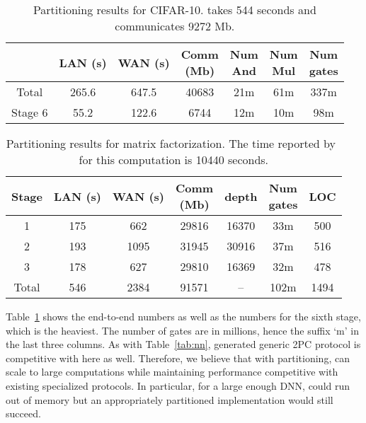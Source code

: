 \setlength\tabcolsep{6pt}
\begin{table}
\footnotesize
\begin{tabular}{|c|c|c|c |c|c|c|}
\hline
           &  LAN (s) & WAN (s) & \thead{Comm \\ (Mb)}  & \thead{Num \\ And} & \thead{Num \\ Mul} & \thead{Num \\ gates} \\
\hline
Total      &  265.6       & 647.5        & 40683       & 21m    & 61m    &  337m  \\
\hline
Stage 6    &  55.2        & 122.6        & 6744        & 12m    & 10m   &  98m  \\
\hline
\end{tabular}

 \caption{Partitioning results for CIFAR-10. \minion takes 544 seconds and communicates 9272 Mb.}
 \label{tab:cifar} 
\end{table}

\begin{table}[t]
\footnotesize
\begin{tabular}{|c|c|c|c |c|c| c|}
\hline
  Stage         &  LAN (s) & WAN (s) & \thead{Comm \\ (Mb)}  & depth & \thead{Num \\ gates} & LOC\\
\hline
1    &  175       & 662        & 29816       & 16370    & 33m    & 500  \\
\hline
2    &  193        & 1095        & 31945        & 30916    & 37m & 516 \\
\hline
3    &  178        & 627        & 29810        & 16369    & 32m  & 478  \\
\hline
Total    &  546      & 2384        & 91571        & --    & 102m & 1494 \\
\hline
\end{tabular}

 \caption{Partitioning results for matrix factorization. The time reported by~\cite{valeriaMatrix} for this computation is 10440 seconds.}
 \label{tab:factor} 
\end{table}
Table~\ref{tab:cifar} shows the end-to-end numbers as
well as the numbers for the sixth stage, which is the heaviest. 
The number of gates are in millions, hence the suffix `m' in the last
three columns.
As with Table~\ref{tab:nn}, \tool generated generic 2PC protocol is
competitive with \minion here as well. Therefore,
we believe that with partitioning, \tool can scale to large
computations while maintaining performance
competitive with existing specialized protocols. In particular, for a
large enough DNN, \minion could run
out of memory but an appropriately partitioned \tool implementation would still
succeed.

